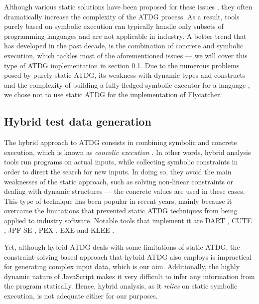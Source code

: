 Although various static solutions have been proposed for these issues \cite{ramamoorthy1976automated,goldberg1994applications,offutt1999dynamic}, they often dramatically increase the complexity of the ATDG process. As a result, tools purely based on symbolic execution can typically handle only subsets of programming languages and are not applicable in industry. A better trend that has developed in the past decade, is the combination of concrete and symbolic execution, which tackles most of the aforementioned issues \cite{păsăreanu2009survey} --- we will cover this type of ATDG implementation in section \ref{subsec:hybrid_atdg}. Due to the numerous problems posed by purely static ATDG, its weakness with dynamic types and constructs \cite{edvardsson1999survey,tahbildar2automated} and the complexity of building a fully-fledged symbolic executor for a language \cite{edvardsson1999survey,han2008empirical}, we chose not to use static ATDG for the implementation of \textsf{Flycatcher}.

\subsection{Hybrid test data generation}
\label{subsec:hybrid_atdg}

The hybrid approach to ATDG consists in combining symbolic and concrete execution, which is known as \emph{concolic execution} \cite{păsăreanu2009survey}. In other words, hybrid analysis tools run programs on actual inputs, while collecting symbolic constraints in order to direct the search for new inputs. In doing so, they avoid the main weaknesses of the static approach, such as solving non-linear constraints or dealing with dynamic structures --- the concrete values are used in these cases. This type of technique has been popular in recent years, mainly because it overcame the limitations that prevented static ATDG techniques from being applied to industry software. Notable tools that implement it are DART \cite{godefroid2005dart}, CUTE \cite{sen2005cute}, JPF-SE \cite{anand2007jpf}, PEX \cite{tillmann2008pex}, EXE \cite{cadar2008exe} and KLEE \cite{cadar2008klee}.

Yet, although hybrid ATDG deals with some limitations of static ATDG, the constraint-solving based approach that hybrid ATDG also employs is impractical for generating complex input data, which is our aim. Additionally, the highly dynamic nature of JavaScript makes it very difficult to infer any information from the program statically. Hence, hybrid analysis, as it \emph{relies} on static symbolic execution, is not adequate either for our purposes.

